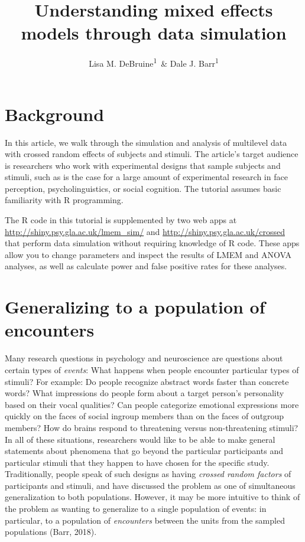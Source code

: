 \documentclass[doc,floatsintext]{apa6}
\title{Understanding mixed effects models through data simulation}
\author{Lisa M. DeBruine\textsuperscript{1}~\& Dale J. Barr\textsuperscript{1}}
\date{}
\affiliation{
\vspace{0.5cm}
\textsuperscript{1} Institute of Neuroscience and Psychology, University of Glasgow}
\begin{document}
\maketitle

\hypertarget{background}{%
\section{Background}\label{background}}

In this article, we walk through the simulation and analysis of multilevel data with crossed random effects of subjects and stimuli. The article's target audience is researchers who work with experimental designs that sample subjects and stimuli, such as is the case for a large amount of experimental research in face perception, psycholinguistics, or social cognition. The tutorial assumes basic familiarity with R programming.

The R code in this tutorial is supplemented by two web apps at \url{http://shiny.psy.gla.ac.uk/lmem_sim/} and \url{http://shiny.psy.gla.ac.uk/crossed} that perform data simulation without requiring knowledge of R code. These apps allow you to change parameters and inspect the results of LMEM and ANOVA analyses, as well as calculate power and false positive rates for these analyses.

\hypertarget{generalizing-to-a-population-of-encounters}{%
\section{Generalizing to a population of encounters}\label{generalizing-to-a-population-of-encounters}}

Many research questions in psychology and neuroscience are questions about certain types of \emph{events}: What happens when people encounter particular types of stimuli? For example: Do people recognize abstract words faster than concrete words? What impressions do people form about a target person's personality based on their vocal qualities? Can people categorize emotional expressions more quickly on the faces of social ingroup members than on the faces of outgroup members? How do brains respond to threatening versus non-threatening stimuli? In all of these situations, researchers would like to be able to make general statements about phenomena that go beyond the particular participants and particular stimuli that they happen to have chosen for the specific study. Traditionally, people speak of such designs as having \emph{crossed random factors} of participants and stimuli, and have discussed the problem as one of simultaneous generalization to both populations. However, it may be more intuitive to think of the problem as wanting to generalize to a single population of events: in particular, to a population of \emph{encounters} between the units from the sampled populations (Barr, 2018).
\end{document}
